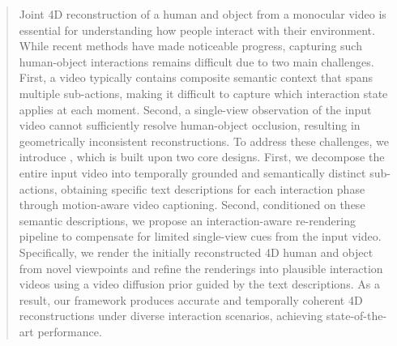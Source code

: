 \begin{abstract}
Joint 4D reconstruction of a human and object from a monocular video is essential for understanding how people interact with their environment.
While recent methods have made noticeable progress, capturing such human-object interactions remains difficult due to two main challenges.
First, a video typically contains composite semantic context that spans multiple sub-actions, making it difficult to capture which interaction state applies at each moment.
Second, a single-view observation of the input video cannot sufficiently resolve human-object occlusion, resulting in geometrically inconsistent reconstructions.
To address these challenges, we introduce \textit{\textbf{\ourmethod}}, which is built upon two core designs.
First, we decompose the entire input video into temporally grounded and semantically distinct sub-actions, obtaining specific text descriptions for each interaction phase through motion-aware video captioning.
Second, conditioned on these semantic descriptions, we propose an interaction-aware re-rendering pipeline to compensate for limited single-view cues from the input video.
Specifically, we render the initially reconstructed 4D human and object from novel viewpoints and refine the renderings into plausible interaction videos using a video diffusion prior guided by the text descriptions.
As a result, our framework produces accurate and temporally coherent 4D reconstructions under diverse interaction scenarios, achieving state-of-the-art performance.
\end{abstract}

